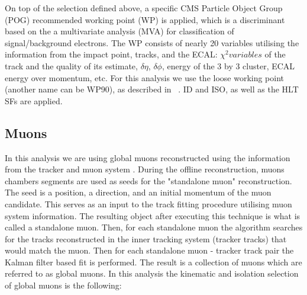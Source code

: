 
        On top of the selection defined above, a specific CMS Particle Object Group (POG) recommended working point (WP) is applied, which is a discriminant based on the a multivariate analysis (MVA) for classification of signal/background electrons. The WP consists of nearly 20 variables utilising the information from the impact point, tracks, and the ECAL: $\chi^2 variables$ of the track and the quality of its estimate, $\delta \eta$, $\delta \phi$, energy of the 3 by 3 cluster, ECAL energy over momentum, etc. For this analysis we use the loose working point (another name can be WP90), as described in ~\cite{vhbbAN}. ID and ISO, as well as the HLT SFs are applied.



\subsection{Muons\label{sec:muons}}
        In this analysis we are using global muons reconstructed using the information from the tracker and muon system \cite{CMS-PAS-MUO-10-002,Chatrchyan:2012xi}. During the offline reconstruction, muons chambers segments are used as seeds for the "standalone muon" reconstruction. The seed is a position, a direction, and an initial momentum of the muon candidate. This serves as an input to the track fitting procedure utilising muon system information. The resulting object after executing this technique is what is called a standalone muon. Then, for each standalone muon the algorithm searches for the tracks reconstructed in the inner tracking system (tracker tracks) that would match the muon. Then for each standalone muon - tracker track pair the Kalman filter based fit is performed. The result is a collection of muons which are referred to as global muons. In this analysis the kinematic and isolation selection of global muons is the following:
        
